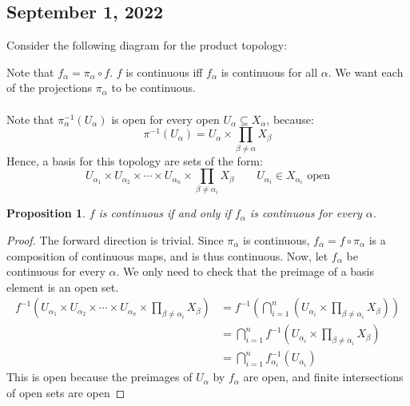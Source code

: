 \documentclass{article}
\newtheorem{proposition}{Proposition}
\begin{document}
\subsection{September 1, 2022}
Consider the following diagram for the product topology:
\begin{center}
\end{center}
Note that $f_\alpha = \pi_\alpha\circ f$. $f$ is continuous iff $f_\alpha$ is continuous for all $\alpha$. We want each of the projections $\pi_\alpha$ to be continuous.\\
\\
Note that $\pi_\alpha^{-1}(U_\alpha)$ is open for every open $U_\alpha\subseteq X_\alpha$, because:
$$\pi^{-1}(U_\alpha)=U_\alpha\times \displaystyle\prod_{\beta\neq \alpha}X_\beta$$
Hence, a basis for this topology are sets of the form:
$$U_{\alpha_1}\times U_{\alpha_2}\times\cdots\times U_{\alpha_n}\times\displaystyle\prod_{\beta\neq \alpha_i}X_\beta\qquad U_{\alpha_i}\in X_{\alpha_i}\text{ open}$$
\begin{proposition}
$f$ is continuous if and only if $f_\alpha$ is continuous for every $\alpha$.
\end{proposition}
\begin{proof}
The forward direction is trivial. Since $\pi_\alpha$ is continuous, $f_\alpha=f\circ\pi_\alpha$ is a composition of continuous maps, and is thus continuous. Now, let $f_\alpha$ be continuous for every $\alpha$. We only need to check that the preimage of a basis element is an open set.
\begin{align*}
    f^{-1}\left(U_{\alpha_1}\times U_{\alpha_2}\times\cdots\times U_{\alpha_n}\times \displaystyle\prod_{\beta\neq \alpha_i}X_\beta\right) &= f^{-1}\left(\bigcap_{i=1}^n\left(U_{\alpha_i}\times\displaystyle\prod_{\beta\neq \alpha_i}X_\beta\right)\right)\\
    &=\bigcap_{i=1}^n f^{-1}\left(U_{\alpha_i}\times\displaystyle\prod_{\beta\neq \alpha_i}X_\beta\right)\\
    &=\bigcap_{i=1}^nf^{-1}_{\alpha_i}(U_{\alpha_i})
\end{align*}
This is open because the preimages of $U_\alpha$ by $f_\alpha$ are open, and finite intersections of open sets are open
\end{proof}
\end{document}

